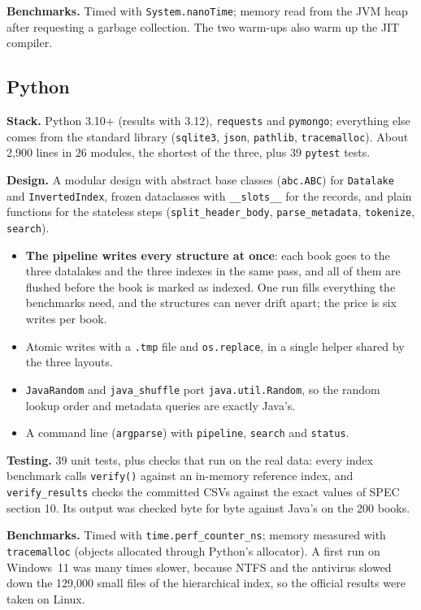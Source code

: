 \documentclass[11pt,a4paper]{article}
\newcommand{\code}[1]{\texttt{#1}}
\begin{document}
\textbf{Benchmarks.} Timed with \code{System.nanoTime}; memory read from the JVM heap after
requesting a garbage collection. The two warm-ups also warm up the JIT compiler.

\subsection{Python}
\textbf{Stack.} Python 3.10+ (results with 3.12), \code{requests} and \code{pymongo}; everything else
comes from the standard library (\code{sqlite3}, \code{json}, \code{pathlib}, \code{tracemalloc}).
About 2,900 lines in 26 modules, the shortest of the three, plus 39 \code{pytest} tests.

\textbf{Design.} A modular design with abstract base classes (\code{abc.ABC}) for \code{Datalake}
and \code{InvertedIndex}, frozen dataclasses with \code{\_\_slots\_\_} for the records, and plain
functions for the stateless steps (\code{split\_header\_body}, \code{parse\_metadata},
\code{tokenize}, \code{search}).
\begin{itemize}
  \item \textbf{The pipeline writes every structure at once}: each book goes to the three datalakes
        and the three indexes in the same pass, and all of them are flushed before the book is
        marked as indexed. One run fills everything the benchmarks need, and the structures can never
        drift apart; the price is six writes per book.
  \item Atomic writes with a \code{.tmp} file and \code{os.replace}, in a single helper shared by the
        three layouts.
  \item \code{JavaRandom} and \code{java\_shuffle} port \code{java.util.Random}, so the random lookup
        order and metadata queries are exactly Java's.
  \item A command line (\code{argparse}) with \code{pipeline}, \code{search} and \code{status}.
\end{itemize}

\textbf{Testing.} 39 unit tests, plus checks that run on the real data: every index benchmark calls
\code{verify()} against an in-memory reference index, and \code{verify\_results} checks the committed
CSVs against the exact values of SPEC section 10. Its output was checked byte for byte against
Java's on the 200 books.

\textbf{Benchmarks.} Timed with \code{time.perf\_counter\_ns}; memory measured with
\code{tracemalloc} (objects allocated through Python's allocator). A first run on Windows~11 was many
times slower, because NTFS and the antivirus slowed down the 129,000 small files of the
hierarchical index, so the official results were taken on Linux.
\end{document}

